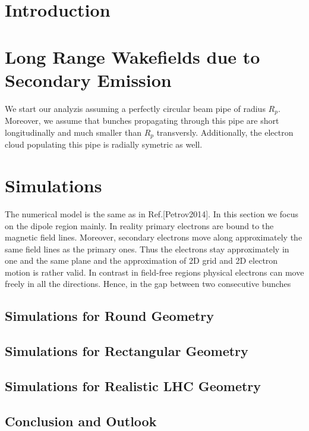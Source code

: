 \documentclass[5p]{elsarticle}%
\begin{document}
\section{Introduction}

\section{Long Range Wakefields due to Secondary Emission}

	We start our analyzis assuming a perfectly circular beam pipe of radius $R_{p}$.
	Moreover, we assume that bunches propagating through this pipe are short longitudinally and much smaller than $R_{p}$ transversly.
	Additionally, the electron cloud populating this pipe is radially symetric as well.

\section{Simulations}
	The numerical model is the same as in Ref.[Petrov2014].
	In this section we focus on the dipole region mainly. 
	In reality primary electrons are bound to the magnetic field lines.
	Moreover, secondary electrons move along approximately the same field lines as the primary ones.
	Thus the electrons stay approximately in one and the same plane and the approximation of 2D grid and 2D electron motion is rather valid.
	In contrast in field-free regions physical electrons can move freely in all the directions.
	Hence, in the gap between two consecutive bunches

\subsection{Simulations for Round Geometry}

\subsection{Simulations for Rectangular Geometry}

\subsection{Simulations for Realistic LHC Geometry}

\subsection{Conclusion and Outlook}

\begin{thebibliography}{16}%


\end{thebibliography}%
\end{document}
